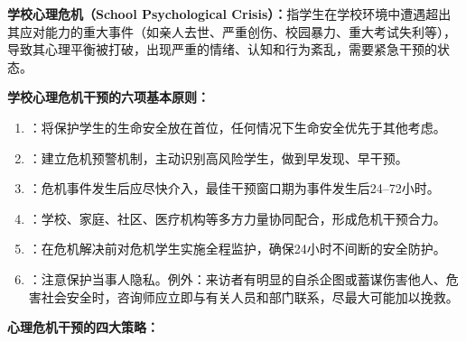 \begin{defbox}
\textbf{学校心理危机（School Psychological Crisis）：}指学生在学校环境中遭遇超出其应对能力的重大事件（如亲人去世、严重创伤、校园暴力、重大考试失利等），导致其心理平衡被打破，出现严重的情绪、认知和行为紊乱，需要紧急干预的状态。
\end{defbox}

\begin{keybox}
\textbf{学校心理危机干预的六项基本原则：}

\begin{enumerate}[leftmargin=*]
    \item {}：将保护学生的生命安全放在首位，任何情况下生命安全优先于其他考虑。
    \item {}：建立危机预警机制，主动识别高风险学生，做到早发现、早干预。
    \item {}：危机事件发生后应尽快介入，最佳干预窗口期为事件发生后24--72小时。
    \item {}：学校、家庭、社区、医疗机构等多方力量协同配合，形成危机干预合力。
    \item {}：在危机解决前对危机学生实施全程监护，确保24小时不间断的安全防护。
    \item {}：注意保护当事人隐私。例外：来访者有明显的自杀企图或蓄谋伤害他人、危害社会安全时，咨询师应立即与有关人员和部门联系，尽最大可能加以挽救。
\end{enumerate}

\textbf{心理危机干预的四大策略：}


\end{keybox}
